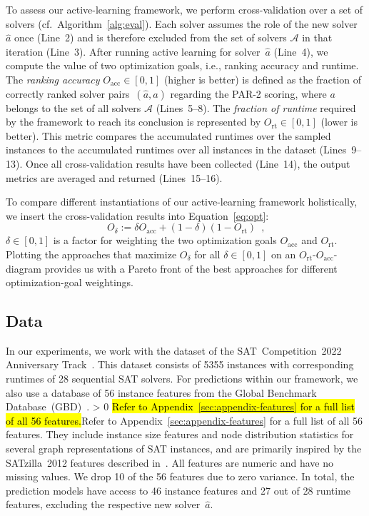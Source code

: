 \documentclass[sn-basic, Numbered]{sn-jnl} %
\newcommand{\showchanges}{1} %
\newcommand{\change}[1]{\ifnum \showchanges > 0 \sethlcolor{yellow}\hl{#1}\else#1\fi}
\begin{document}
To assess our active-learning framework, we perform cross-validation over a set of solvers (cf.~Algorithm~\ref{alg:eval}).
Each solver assumes the role of the new solver~$\hat{a}$ once (Line~2) and is therefore excluded from the set of solvers $\mathcal{A}$ in that iteration (Line~3).
After running active learning for solver~$\hat{a}$ (Line~4), we compute the value of two optimization goals, i.e., ranking accuracy and runtime.
The \emph{ranking accuracy} $O_{\operatorname{acc}} \in \left[0, 1\right]$ (higher is better) is defined as the fraction of correctly ranked solver pairs~$\left(\hat{a}, a\right)$ regarding the PAR-2 scoring, where $a$ belongs to the set of all solvers $\mathcal{A}$ (Lines~5--8).
The \emph{fraction of runtime} required by the framework to reach its conclusion is represented by $O_{\operatorname{rt}} \in [0, 1]$ (lower is better).
This metric compares the accumulated runtimes over the sampled instances to the accumulated runtimes over all instances in the dataset (Lines~9--13).
Once all cross-validation results have been collected (Line~14), the output metrics are averaged and returned (Lines~15--16).

To compare different instantiations of our active-learning framework holistically, we insert the cross-validation results into Equation~\eqref{eq:opt}:
%
\begin{equation}
	O_\delta := \delta O_{\operatorname{acc}} + \left(1 - \delta\right) \left(1 - O_{\operatorname{rt}}\right) \enspace \textrm{,}
	\label{eq:opt}
\end{equation} 
%
$\delta \in \left[0, 1\right]$ is a factor for weighting the two optimization goals $O_{\operatorname{acc}}$ and $O_{\operatorname{rt}}$.
Plotting the approaches that maximize $O_\delta$ for all $\delta \in \left[0, 1\right]$ on an $O_{\operatorname{rt}}$-$O_{\operatorname{acc}}$-diagram provides us with a Pareto front of the best approaches for different optimization-goal weightings.

\subsection{Data}
\label{sec:exdesign:data}

In our experiments, we work with the dataset of the SAT~Competition~2022 Anniversary Track~\cite{sat2022,zenodoanniversarytrack}.
This dataset consists of 5355 instances with corresponding runtimes of 28 sequential SAT solvers.
For predictions within our framework, we also use a database of 56 instance features from the Global Benchmark Database~(GBD)~\cite{IserJ24}.
\change{Refer to Appendix~\ref{sec:appendix-features} for a full list of all 56 features.}
They include instance size features and node distribution statistics for several graph representations of SAT instances, and are primarily inspired by the SATzilla~2012 features described in~\cite{features}.
All features are numeric and have no missing values.
We drop 10 of the 56 features due to zero variance.
In total, the prediction models have access to 46 instance features and 27 out of 28 runtime features, excluding the respective new solver~$\hat{a}$.
\end{document}
